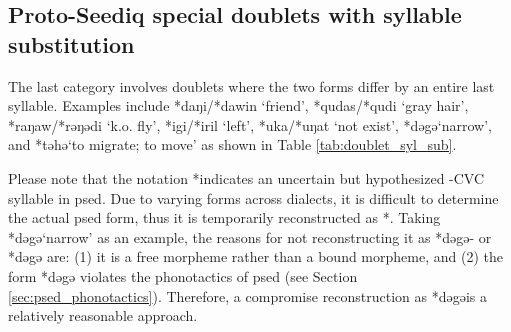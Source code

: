\subsection{Proto-Seediq special doublets with syllable substitution} \label{sec:syl_sub}

The last category involves doublets where the two forms differ by an entire last syllable. Examples include *daŋi/*dawin `friend', *qudas/*qudi `gray hair', *raŋaw/*rəŋədi `k.o. fly', *igi/*iril `left', *uka/*uŋat `not exist', *dəgə\cvc `narrow', and *təhə\cvc `to migrate; to move' as shown in Table \ref{tab:doublet_syl_sub}. 

Please note that the notation *\cvc indicates an uncertain but hypothesized -CVC syllable in \acl{psed}. Due to varying forms across dialects, it is difficult to determine the actual \acl{psed} form, thus it is temporarily reconstructed as *\cvc. Taking *dəgə\cvc `narrow' as an example, the reasons for not reconstructing it as *dəgə- or *dəgə are: (1) it is a free morpheme rather than a bound morpheme, and (2) the form *dəgə violates the phonotactics of \acl{psed} (see Section \ref{sec:psed_phonotactics}). Therefore, a compromise reconstruction as *dəgə\cvc is a relatively reasonable approach.

